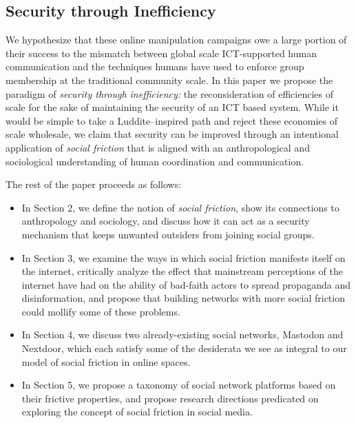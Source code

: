 \documentclass[sigconf,authordraft]{acmart}
\begin{document}
\subsection{Security through Inefficiency}

We hypothesize that these online manipulation campaigns owe a large portion of their success to the
mismatch between global scale ICT-supported human communication and the techniques humans have used
to enforce group membership at the traditional community scale. In this paper we propose the
paradigm of \emph{security through inefficiency:} the reconsideration of efficiencies of scale for
the sake of maintaining the security of an ICT based system. While it would be simple to take a
Luddite--inspired path and reject these economies of scale wholesale, we claim that security can be
improved through an intentional application of \emph{social friction} that is aligned with an
anthropological and sociological understanding of human coordination and communication.

The rest of the paper proceeds as follows:

\begin{itemize}
\item In Section 2, we define the notion of \textit{social friction}, show its connections to
anthropology and sociology, and discuss how it can act as a security mechanism that keeps unwanted
outsiders from joining social groups.
\item In Section 3, we examine the ways in which social friction manifests itself on the internet,
critically analyze the effect that mainstream perceptions of the internet have had on the ability of
bad-faith actors to spread propaganda and disinformation, and propose that building networks with
more social friction could mollify some of these problems.
\item In Section 4, we discuss two already-existing social networks, Mastodon and Nextdoor, which
each satisfy some of the desiderata we see as integral to our model of social friction in online
spaces.
\item In Section 5, we propose a taxonomy of social network platforms based on their frictive
properties, and propose research directions predicated on exploring the concept of social friction
in social media.
\end{itemize}
\end{document}
